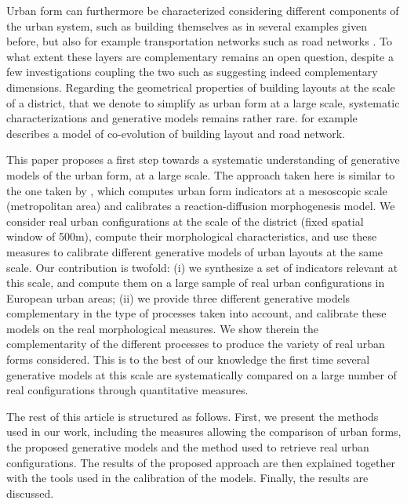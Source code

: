 \documentclass[letterpaper]{article}
\begin{document}

Urban form can furthermore be characterized considering different components of the urban system, such as building themselves as in several examples given before, but also for example transportation networks such as road networks \citep{ye2014quantitative}. To what extent these layers are complementary remains an open question, despite a few investigations coupling the two such as \cite{raimbault2018urban} suggesting indeed complementary dimensions. Regarding the geometrical properties of building layouts at the scale of a district, that we denote to simplify as urban form at a large scale, systematic characterizations and generative models remains rather rare. \cite{achibet2014model} for example describes a model of co-evolution of building layout and road network.



This paper proposes a first step towards a systematic understanding of generative models of the urban form, at a large scale.
The approach taken here is similar to the one taken by \cite{raimbault2018calibration}, which computes urban form indicators at a mesoscopic scale (metropolitan area) and calibrates a reaction-diffusion morphogenesis model.
We consider real urban configurations at the scale of the district (fixed spatial window of 500m), compute their morphological characteristics, and use these measures to calibrate different generative models of urban layouts at the same scale.
Our contribution is twofold: (i) we synthesize a set of indicators relevant at this scale, and compute them on a large sample of real urban configurations in European urban areas; (ii) we provide three different generative models complementary in the type of processes taken into account, and calibrate these models on the real morphological measures. We show therein the complementarity of the different processes to produce the variety of real urban forms considered.
This is to the best of our knowledge the first time several generative models at this scale are systematically compared on a large number of real configurations through quantitative measures.

The rest of this article is structured as follows.
First, we present the methods used in our work, including the measures allowing the comparison of urban forms, the proposed generative models and the method used to retrieve real urban configurations.
The results of the proposed approach are then explained together with the tools used in the calibration of the models.
Finally, the results are discussed.
\end{document}
